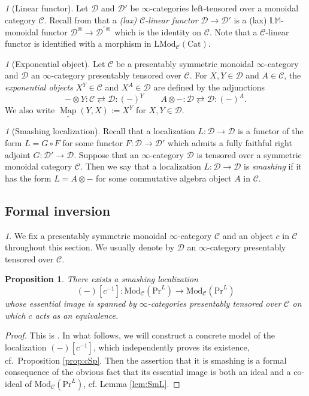 \documentclass{amsart}
\theoremstyle{plain}
\newtheorem{proposition}[theorem]{Proposition}
\theoremstyle{definition}
\theoremstyle{remark}
\newtheorem{p}[theorem]{}
\numberwithin{equation}{theorem}
\newcommand{\mcal}[1]{\mathcal{#1}}
\newcommand{\mbb}[1]{\mathbb{#1}}
\newcommand{\Cat}{\mathrm{Cat}}
\newcommand{\LMod}{\mathrm{LMod}}
\newcommand{\Mod}{\mathrm{Mod}}
\renewcommand{\Pr}{\mathrm{Pr}}
\newcommand{\Map}{\operatorname{Map}}
\newcommand{\intMap}{\underline{\Map}}
\begin{document}
\begin{p}[Linear functor]
Let $\mcal{D}$ and $\mcal{D}'$ be $\infty$-categories left-tensored over a monoidal category $\mcal{C}$.
Recall from \cite[4.6.2.7]{HA} that a \textit{(lax) $\mcal{C}$-linear functor} $\mcal{D}\to\mcal{D}'$ is a (lax) $\mbb{LM}$-monoidal functor $\mcal{D}^\otimes\to\mcal{D}^{\prime\otimes}$ which is the identity on $\mcal{C}$.
Note that a $\mcal{C}$-linear functor is identified with a morphism in $\LMod_\mcal{C}(\Cat)$. 
\end{p}

\begin{p}[Exponential object]
Let $\mcal{C}$ be a presentably symmetric monoidal $\infty$-category and $\mcal{D}$ an $\infty$-category presentably tensored over $\mcal{C}$.
For $X,Y\in\mcal{D}$ and $A\in\mcal{C}$, the \textit{exponential objects} $X^Y\in\mcal{C}$ and $X^A\in\mcal{D}$ are defined by the adjunctions
\[
	-\otimes Y \colon \mcal{C} \rightleftarrows \mcal{D} \colon (-)^Y \qquad
	A\otimes- \colon \mcal{D} \rightleftarrows \mcal{D} \colon (-)^A.
\]
We also write $\intMap(Y,X):=X^Y$ for $X,Y\in\mcal{D}$.
\end{p}

\begin{p}[Smashing localization]
Recall that a localization $L\colon\mcal{D}\to\mcal{D}$ is a functor of the form $L=G\circ F$ for some functor $F\colon\mcal{D}\to\mcal{D}'$ which admits a fully faithful right adjoint $G\colon\mcal{D}'\to\mcal{D}$.
Suppose that an $\infty$-category $\mcal{D}$ is tensored over a symmetric monoidal category $\mcal{C}$.
Then we say that a localization $L\colon\mcal{D}\to\mcal{D}$ is \textit{smashing} if it has the form $L=A\otimes -$ for some commutative algebra object $A$ in $\mcal{C}$.
\end{p}


\subsection{Formal inversion}\label{Inv}

\begin{p}
We fix a presentably symmetric monoidal $\infty$-category $\mcal{C}$ and an object $c$ in $\mcal{C}$ throughout this section.
We usually denote by $\mcal{D}$ an $\infty$-category presentably tensored over $\mcal{C}$.
\end{p}

\begin{proposition}\label{prop:Inv}
There exists a smashing localization
\[
	(-)[c^{-1}] \colon \Mod_\mcal{C}(\Pr^L) \to \Mod_\mcal{C}(\Pr^L)
\]
whose essential image is spanned by $\infty$-categories presentably tensored over $\mcal{C}$ on which $c$ acts as an equivalence.
\end{proposition}
\begin{proof}
This is \cite[Proposition 2.9]{Ro}.
In what follows, we will construct a concrete model of the localization $(-)[c^{-1}]$, which independently proves its existence, cf.\ Proposition \ref{prop:cSp}.
Then the assertion that it is smashing is a formal consequence of the obvious fact that its essential image is both an ideal and a co-ideal of $\Mod_\mcal{C}(\Pr^L)$, cf. Lemma \ref{lem:SmL}.
\end{proof}
\end{document}
